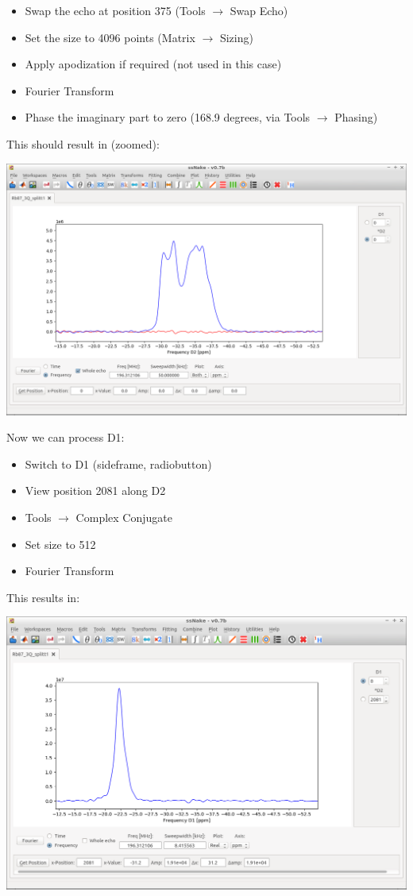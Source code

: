 \documentclass[11pt,a4paper]{article}
\begin{document}
\begin{itemize}
	\item Swap the echo at position 375 (Tools $\longrightarrow$ Swap Echo)
	\item Set the size to 4096 points (Matrix $\longrightarrow$ Sizing)
	\item Apply apodization if required (not used in this case)
	\item Fourier Transform
	\item Phase the imaginary part to zero (168.9 degrees, via Tools $\longrightarrow$ Phasing)
\end{itemize}
This should result in (zoomed):
\begin{center}
\includegraphics[width=0.8\linewidth]{Figs/Fig9.png}
\end{center}
Now we can process D1:

\begin{itemize}
	\item Switch to D1 (sideframe, radiobutton)
	\item View position 2081 along D2
	\item Tools $\longrightarrow$  Complex Conjugate
	\item Set size to 512
	\item Fourier Transform
\end{itemize}
This results in:
\begin{center}
\includegraphics[width=0.8\linewidth]{Figs/Fig10.png}
\end{center}
\end{document}
